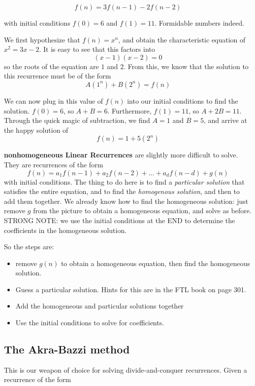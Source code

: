 \documentclass[11pt]{article}
\begin{document}
	$$f(n) = 3f(n-1) - 2f(n-2)$$
	
	with initial conditions $f(0) = 6$ and $f(1) = 11$.  Formidable numbers indeed.
	
	We first hypothesize that $f(n) = x^n$, and obtain the characteristic equation of
	$x^2 = 3x - 2$.  It is easy to see that this factors into
	$$(x-1)(x-2) = 0$$
	so the roots of the equation are $1$ and $2$.  From this, we know that the solution to
	this recurrence must be of the form
	$$A(1^n) + B(2^n) = f(n)$$
	
	We can now plug in this value of $f(n)$ into our initial conditions to find the 	
	solution.  $f(0) = 6$, so $A + B = 6$.  Furthermore, $f(1) = 11$, so $A + 2B = 11$.
	Through the quick magic of subtraction, we find $A=1$ and $B = 5$, and arrive at the
	happy solution of
	$$f(n) = 1 + 5(2^n)$$
	
	\textbf{nonhomogeneous Linear Recurrences} are slightly more difficult to solve. They
	are recurrences of the form
	$$f(n) = a_1 f(n-1) + a_2 f(n-2) + \ldots + a_d f(n-d) + g(n)$$
	with initial conditions.  The thing to do here is to find a 
	\emph{particular solution} that satisfies the entire equation, and to find 
	the \emph{homogenous solution}, and then to add them together.  We already
	know how to find the homogeneous solution: just remove $g$ from the picture to 
	obtain a homogeneous equation, and solve as before.  STRONG NOTE: we use the initial
	conditions at the END to determine the coefficients in the homogeneous solution.
	
	So the steps are:
	
	\begin{itemize}
		\item remove $g(n)$ to obtain a homogeneous equation, then find the homogeneous solution.
		\item Guess a particular solution.  Hints for this are in the FTL book on page 301.
		\item Add the homogeneous and particular solutions together
		\item Use the initial conditions to solve for coefficients. 
	\end{itemize}
	
	 
	
	\subsection{The Akra-Bazzi method}
	
	This is our weapon of choice for solving divide-and-conquer recurrences.  Given
	a recurrence of the form
	
\end{document}
